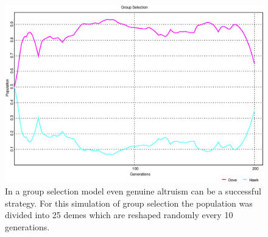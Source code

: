 \begin{figure}
\begin{center}
\includegraphics[width=20cm]{images/group_selection1.eps} %
\caption{\label{groupSelection1} In a group selection model even genuine
altruism can be a successful strategy. For this simulation of group selection
the population was divided into 25 demes which are reshaped randomly every 10
generations.}
\end{center}
\end{figure}


